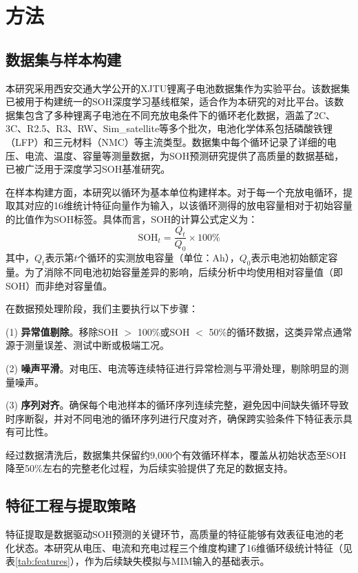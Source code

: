 \documentclass[10pt,a4paper]{ctexart}
\begin{document}
\section{方法}\label{sec:method}

\subsection{数据集与样本构建}

本研究采用西安交通大学公开的XJTU锂离子电池数据集作为实验平台\cite{wang2024open,duan2025lithium}。该数据集已被用于构建统一的SOH深度学习基线框架\cite{wang2024open}，适合作为本研究的对比平台。该数据集包含了多种锂离子电池在不同充放电条件下的循环老化数据，涵盖了2C、3C、R2.5、R3、RW、Sim\_satellite等多个批次，电池化学体系包括磷酸铁锂（LFP）和三元材料（NMC）等主流类型。数据集中每个循环记录了详细的电压、电流、温度、容量等测量数据，为SOH预测研究提供了高质量的数据基础，已被广泛用于深度学习SOH基准研究\cite{wang2024pinn}。

在样本构建方面，本研究以循环为基本单位构建样本。对于每一个充放电循环，提取其对应的16维统计特征向量作为输入，以该循环测得的放电容量相对于初始容量的比值作为SOH标签。具体而言，SOH的计算公式定义为：
\begin{equation}
    \text{SOH}_t = \frac{Q_t}{Q_0} \times 100\%
\end{equation}
其中，$Q_t$表示第$t$个循环的实测放电容量（单位：Ah），$Q_0$表示电池初始额定容量。为了消除不同电池初始容量差异的影响，后续分析中均使用相对容量值（即SOH）而非绝对容量值。

在数据预处理阶段，我们主要执行以下步骤：

(1) \textbf{异常值剔除}。移除SOH $>$ 100\%或SOH $<$ 50\%的循环数据，这类异常点通常源于测量误差、测试中断或极端工况。

(2) \textbf{噪声平滑}。对电压、电流等连续特征进行异常检测与平滑处理，剔除明显的测量噪声。

(3) \textbf{序列对齐}。确保每个电池样本的循环序列连续完整，避免因中间缺失循环导致时序断裂，并对不同电池的循环序列进行尺度对齐，确保跨实验条件下特征表示具有可比性。

经过数据清洗后，数据集共保留约9,000个有效循环样本，覆盖从初始状态至SOH降至50\%左右的完整老化过程，为后续实验提供了充足的数据支持。

\subsection{特征工程与提取策略}

特征提取是数据驱动SOH预测的关键环节，高质量的特征能够有效表征电池的老化状态\cite{sun2025batteryhealth,wang2022chargingfeatures}。本研究从电压、电流和充电过程三个维度构建了16维循环级统计特征（见表\ref{tab:features}），作为后续缺失模拟与MIM输入的基础表示。
\end{document}

